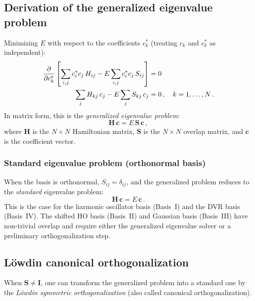 \subsection{Derivation of the generalized eigenvalue problem}

Minimizing $E$ with respect to the coefficients $c_k^*$ (treating $c_k$ and $c_k^*$ as independent):
\begin{align}
  \frac{\partial}{\partial c_k^*}\left[\sum_{i,j}c_i^*c_j\,H_{ij} - E\sum_{i,j}c_i^*c_j\,S_{ij}\right] &= 0\notag\\
  \sum_j H_{kj}\,c_j - E\sum_j S_{kj}\,c_j &= 0\,,\quad k = 1,\ldots, N\,.
\end{align}
In matrix form, this is the \emph{generalized eigenvalue problem}:
\begin{equation}\label{eq:gen_eig}
  \boxed{\mathbf{H}\,\mathbf{c} = E\,\mathbf{S}\,\mathbf{c}\,,}
\end{equation}
where $\mathbf{H}$ is the $N\times N$ Hamiltonian matrix, $\mathbf{S}$ is the $N\times N$
overlap matrix, and $\mathbf{c}$ is the coefficient vector.

\subsubsection{Standard eigenvalue problem (orthonormal basis)}

When the basis is orthonormal, $S_{ij} = \delta_{ij}$, and the generalized problem
reduces to the \emph{standard} eigenvalue problem:
\begin{equation}\label{eq:std_eig}
  \boxed{\mathbf{H}\,\mathbf{c} = E\,\mathbf{c}\,.}
\end{equation}
This is the case for the harmonic oscillator basis (Basis~I) and the DVR basis (Basis~IV).
The shifted HO basis (Basis~II) and Gaussian basis (Basis~III) have non-trivial overlap
and require either the generalized eigenvalue solver or a preliminary orthogonalization step.

\subsection{L\"owdin canonical orthogonalization}\label{sec:Lowdin}

When $\mathbf{S} \neq \mathbf{I}$, one can transform the generalized problem into
a standard one by the \emph{L\"owdin symmetric orthogonalization} (also called
canonical orthogonalization).

